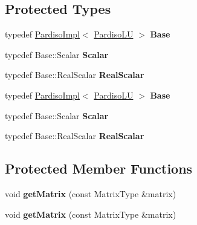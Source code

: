 \subsection*{Protected Types}
\begin{DoxyCompactItemize}
\item 
\mbox{\label{class_eigen_1_1_pardiso_l_u_a828d8c2d392e2304d18aedef4cb647e8}} 
typedef \hyperlink{class_eigen_1_1_pardiso_impl}{Pardiso\+Impl}$<$ \hyperlink{class_eigen_1_1_pardiso_l_u}{Pardiso\+LU} $>$ {\bfseries Base}
\item 
\mbox{\label{class_eigen_1_1_pardiso_l_u_a980c6f143fbc5dada4b61766c5a40910}} 
typedef Base\+::\+Scalar {\bfseries Scalar}
\item 
\mbox{\label{class_eigen_1_1_pardiso_l_u_a646566f09e32d2f2034950261ee748b0}} 
typedef Base\+::\+Real\+Scalar {\bfseries Real\+Scalar}
\item 
\mbox{\label{class_eigen_1_1_pardiso_l_u_a828d8c2d392e2304d18aedef4cb647e8}} 
typedef \hyperlink{class_eigen_1_1_pardiso_impl}{Pardiso\+Impl}$<$ \hyperlink{class_eigen_1_1_pardiso_l_u}{Pardiso\+LU} $>$ {\bfseries Base}
\item 
\mbox{\label{class_eigen_1_1_pardiso_l_u_a980c6f143fbc5dada4b61766c5a40910}} 
typedef Base\+::\+Scalar {\bfseries Scalar}
\item 
\mbox{\label{class_eigen_1_1_pardiso_l_u_a646566f09e32d2f2034950261ee748b0}} 
typedef Base\+::\+Real\+Scalar {\bfseries Real\+Scalar}
\end{DoxyCompactItemize}
\subsection*{Protected Member Functions}
\begin{DoxyCompactItemize}
\item 
\mbox{\label{class_eigen_1_1_pardiso_l_u_ae9c24d54ea4eb0bfa43091cae3196735}} 
void {\bfseries get\+Matrix} (const Matrix\+Type \&matrix)
\item 
\mbox{\label{class_eigen_1_1_pardiso_l_u_ae9c24d54ea4eb0bfa43091cae3196735}} 
void {\bfseries get\+Matrix} (const Matrix\+Type \&matrix)
\end{DoxyCompactItemize}
